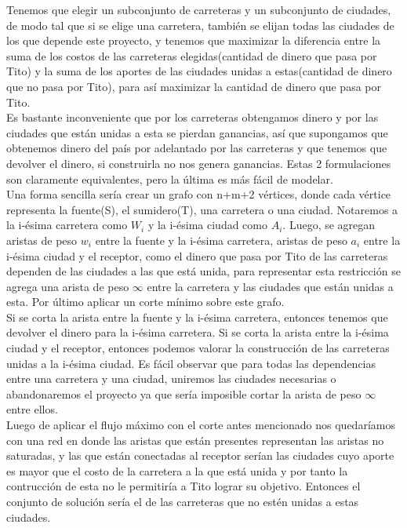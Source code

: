 \documentclass[runningheads,a4paper]{llncs}
\begin{document}
{Tenemos que elegir un subconjunto de carreteras y un subconjunto de ciudades, de modo tal que si se elige una carretera, tambi\'en se elijan todas las ciudades de los que depende este proyecto, y tenemos que maximizar la diferencia entre la suma de los costos de las carreteras elegidas(cantidad de dinero que pasa por Tito) y la suma de los aportes de las ciudades unidas a estas(cantidad de dinero que no pasa por Tito), para as\'i maximizar la cantidad de dinero que pasa por Tito.\\

Es bastante inconveniente que por los carreteras obtengamos dinero y por las ciudades que est\'an unidas a esta se pierdan ganancias, as\'i que supongamos que obtenemos dinero del pa\'is por adelantado  por las carreteras y que tenemos que devolver el dinero, si construirla no nos genera ganancias. Estas 2 formulaciones son claramente equivalentes, pero la \'ultima es m\'as f\'acil de modelar.\\

Una forma sencilla ser\'ia crear un grafo con n+m+2 v\'ertices, donde cada v\'ertice representa la fuente(S), el sumidero(T), una carretera o una ciudad. Notaremos a la i-\'esima carretera como $W_i$ y la i-\'esima ciudad como $A_i$. Luego, se agregan aristas de peso $w_i$ entre la fuente y la i-\'esima carretera, aristas de peso $a_i$ entre la i-\'esima ciudad y el receptor, como el dinero que pasa por Tito de las carreteras dependen de las ciudades a las que est\'a unida, para representar esta restricci\'on se agrega una arista de peso $\infty$ entre la carretera y las ciudades que est\'an unidas a esta. Por \'ultimo aplicar un corte m\'inimo sobre este grafo.\\

Si se corta la arista entre la fuente y la i-\'esima carretera, entonces tenemos que devolver el dinero para la i-\'esima carretera. Si se corta la arista entre la i-\'esima ciudad y el receptor, entonces podemos valorar la construcci\'on de las carreteras unidas a la i-\'esima ciudad. Es f\'acil observar que para todas las dependencias entre una carretera y una ciudad, uniremos las ciudades necesarias o abandonaremos el proyecto ya que ser\'ia imposible cortar la arista de peso $\infty$ entre ellos.\\

Luego de aplicar el flujo m\'aximo con el corte antes mencionado nos quedar\'iamos con una red en donde las aristas que est\'an presentes representan las aristas no saturadas, y las que est\'an conectadas al receptor ser\'ian las ciudades cuyo aporte es mayor que el costo de la carretera a la que est\'a unida y por tanto la contrucci\'on de esta no le permitir\'ia a Tito lograr su objetivo. Entonces el conjunto de soluci\'on ser\'ia el de las carreteras que no est\'en unidas a estas ciudades.

}
\end{document}
